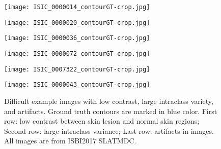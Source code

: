 \documentclass{article}
\begin{document}
\begin{figure}[htb]

\begin{minipage}[b]{.48\linewidth}
  \centering
  \centerline{\texttt{[image: ISIC\_0000014\_contourGT-crop.jpg]}}
\end{minipage}
%
\begin{minipage}[b]{.48\linewidth}
  \centering
  \centerline{\texttt{[image: ISIC\_0000020\_contourGT-crop.jpg]}}
\end{minipage}
\hfill
\begin{minipage}[b]{0.48\linewidth}
  \centering
  \centerline{\texttt{[image: ISIC\_0000036\_contourGT-crop.jpg]}}
\end{minipage}
\begin{minipage}[b]{0.48\linewidth}
  \centering
  \centerline{\texttt{[image: ISIC\_0000072\_contourGT-crop.jpg]}}
\end{minipage}
\begin{minipage}[b]{0.48\linewidth}
  \centering
  \centerline{\texttt{[image: ISIC\_0007322\_contourGT-crop.jpg]}}
\end{minipage}
\hfill
\begin{minipage}[b]{0.48\linewidth}
  \centering
  \centerline{\texttt{[image: ISIC\_0000043\_contourGT-crop.jpg]}}
\end{minipage} 
\caption{Difficult example images with low contrast, large intraclass variety, and artifacts. Ground truth contours are marked in blue color. First row: low contrast between skin lesion and normal skin regions; Second row: large intraclass variance; Last row: artifacts in images. All images are from ISBI2017 SLATMDC\cite{2017-ISBI-SkinLesionChallenge}.}
\label{fig:example-artifacts}
%
\end{figure}
\end{document}
